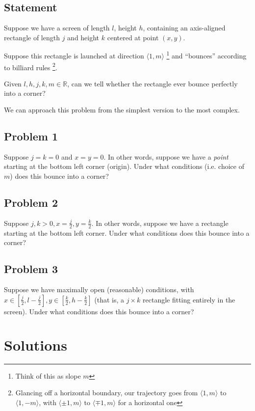 \documentclass[11pt, oneside]{article} 	%
\begin{document}
\subsection{Statement} 
Suppose we have a screen of length $l$, height $h$, containing an axis-aligned rectangle of length $j$ and height $k$ centered at point $(x, y)$.

Suppose this rectangle is launched at direction $\langle 1, m\rangle$ \footnote {Think of this as slope $m$} and ``bounces'' according to billiard rules \footnote{Glancing off a horizontal boundary, our trajectory goes from $\langle 1, m \rangle$ to $\langle 1, -m \rangle$, with $\langle \pm 1, m \rangle$ to $\langle \mp 1, m \rangle$ for a horizontal one}.

Given $l, h, j, k, m \in \mathbb{R}$, can we tell whether the rectangle ever bounce perfectly into a corner?  

We can approach this problem from the simplest version to the most complex.

\subsection{Problem 1} 

Suppose $j = k = 0$ and $x = y = 0$. In other words, suppose we have a \emph{point} starting at the bottom left corner
 (origin).  Under what conditions (i.e. choice of $m$) does this bounce into a corner?


\subsection{Problem 2} 

Suppose $j, k > 0, x = \frac{j}{2}, y = \frac{k}{2}$. In other words, suppose we have a rectangle starting at the bottom left corner. Under what conditions does this bounce into a corner?

\subsection{Problem 3} 

Suppose we have maximally open (reasonable) conditions, with $x \in [\frac{j}{2}, l - \frac{j}{2}], y \in [\frac{k}{2}, h - \frac{k}{2}]$ (that is, a $j \times k$ rectangle fitting entirely in the screen). Under what conditions does this bounce into a corner?


\section{Solutions}
\end{document}
